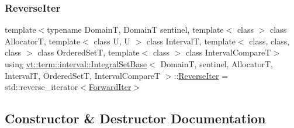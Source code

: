 \mbox{\label{structvt_1_1term_1_1interval_1_1_integral_set_base_af36c82de08ca3e67714c9051d9f3db92}} 
\subsubsection{\texorpdfstring{Reverse\+Iter}{ReverseIter}}
{\footnotesize\ttfamily template$<$typename DomainT, DomainT sentinel, template$<$ class $>$ class AllocatorT, template$<$ class U, U $>$ class IntervalT, template$<$ class, class, class $>$ class Ordered\+SetT, template$<$ class $>$ class Interval\+CompareT$>$ \\
using \hyperlink{structvt_1_1term_1_1interval_1_1_integral_set_base}{vt\+::term\+::interval\+::\+Integral\+Set\+Base}$<$ DomainT, sentinel, AllocatorT, IntervalT, Ordered\+SetT, Interval\+CompareT $>$\+::\hyperlink{structvt_1_1term_1_1interval_1_1_integral_set_base_af36c82de08ca3e67714c9051d9f3db92}{Reverse\+Iter} =  std\+::reverse\+\_\+iterator$<$\hyperlink{structvt_1_1term_1_1interval_1_1_integral_set_base_abd0d7f40a96384d2db0a2782a8921a34}{Forward\+Iter}$>$}



\subsection{Constructor \& Destructor Documentation}
\mbox{\label{structvt_1_1term_1_1interval_1_1_integral_set_base_a0826331831d6c87ec6b81a9264f98e12}} 
